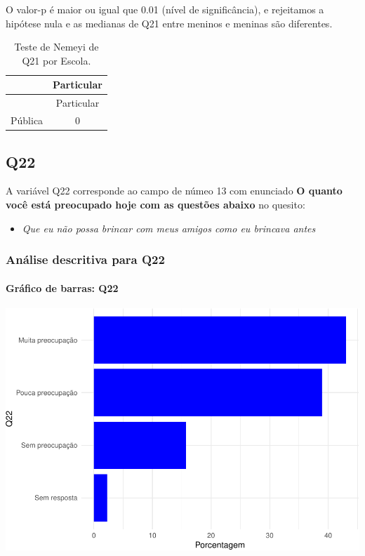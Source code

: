 \documentclass[]{article}
\providecommand{\tightlist}{%
  \setlength{\itemsep}{0pt}\setlength{\parskip}{0pt}}
\let\oldparagraph\paragraph
\renewcommand{\paragraph}[1]{\oldparagraph{#1}\mbox{}}
\begin{document}
O valor-p é maior ou igual que 0.01 (nível de significância), e rejeitamos a hipótese nula e as medianas de Q21 entre meninos e meninas são diferentes.

\begin{longtable}[]{@{}lc@{}}
\caption{\label{tab:unnamed-chunk-474}Teste de Nemeyi de Q21 por Escola.}\tabularnewline
\toprule
& Particular\tabularnewline
\midrule
\endfirsthead
\toprule
& Particular\tabularnewline
\midrule
\endhead
Pública & 0\tabularnewline
\bottomrule
\end{longtable}

\cleardoublepage

\hypertarget{q22}{%
\subsection{Q22}\label{q22}}

A variável Q22 corresponde ao campo de númeo 13 com enunciado \textbf{O quanto você está preocupado hoje com as questões abaixo} no quesito:

\begin{itemize}
\tightlist
\item
  \emph{Que eu não possa brincar com meus amigos como eu brincava antes}
\end{itemize}

\hypertarget{anuxe1lise-descritiva-para-q22}{%
\subsubsection{Análise descritiva para Q22}\label{anuxe1lise-descritiva-para-q22}}

\hypertarget{gruxe1fico-de-barras-q22}{%
\paragraph{Gráfico de barras: Q22}\label{gruxe1fico-de-barras-q22}}

\begin{center}\includegraphics[width=0.75\linewidth]{relatorio_covid19_files/figure-latex/unnamed-chunk-481-1} \end{center}
\end{document}
